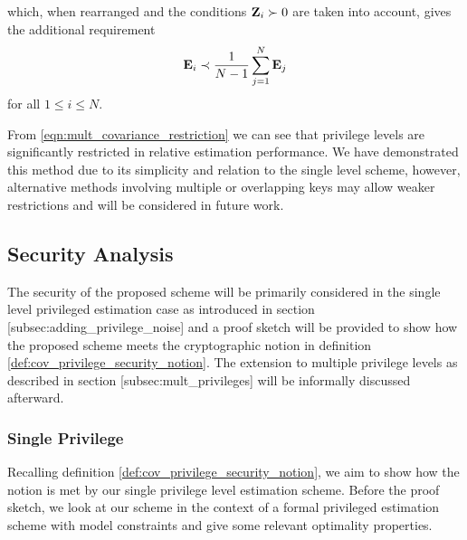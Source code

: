 which, when rearranged and the conditions ${{\mathbf{Z}}}_i\succ 0$ are taken into account, gives the additional requirement
\begin{equation}\label{eqn:mult_covariance_restriction}
   {\ensuremath{{\mathbf{E}}}}_i \prec \frac{1}{N-1}\sum_{j=1}^{N}{{\mathbf{E}}}_j
\end{equation}
for all $1 \leq i \leq N$.

From \eqref{eqn:mult_covariance_restriction} we can see that privilege levels are significantly restricted in relative estimation performance. We have demonstrated this method due to its simplicity and relation to the single level scheme, however, alternative methods involving multiple or overlapping keys may allow weaker restrictions and will be considered in future work.

% 
% 

\subsection{Security Analysis}\label{subsec:priv_estimation:est_security}
The security of the proposed scheme will be primarily considered in the single level privileged estimation case as introduced in section [subsec:adding\_privilege\_noise] and a proof sketch will be provided to show how the proposed scheme meets the cryptographic notion in definition \ref{def:cov_privilege_security_notion}. The extension to multiple privilege levels as described in section [subsec:mult\_privileges] will be informally discussed afterward.

% 
% 

\subsubsection{Single Privilege}
Recalling definition \ref{def:cov_privilege_security_notion}, we aim to show how the notion is met by our single privilege level estimation scheme. Before the proof sketch, we look at our scheme in the context of a formal privileged estimation scheme with model constraints and give some relevant optimality properties.

